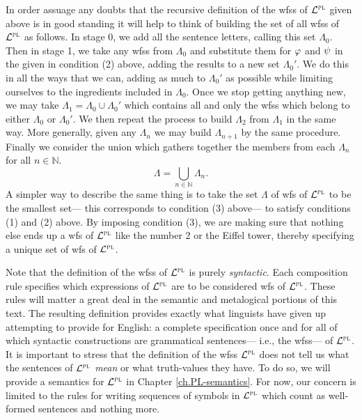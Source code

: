 In order assuage any doubts that the recursive definition of the wfss of $\mathcal{L}^{\textsc{pl}}$ given above is in good standing it will help to think of building the set of all wfss of $\mathcal{L}^{\textsc{pl}}$ as follows.
In stage 0, we add all the sentence letters, calling this set $\Lambda_0$.
Then in stage 1, we take any wfss from $\Lambda_0$ and substitute them for $\varphi$ and $\psi$ in the  given in condition (2) above, adding the results to a new set $\Lambda_0'$.
We do this in all the ways that we can, adding as much to $\Lambda_0'$ as possible while limiting ourselves to the ingredients included in $\Lambda_0$. 
Once we stop getting anything new, we may take $\Lambda_1 = \Lambda_0 \cup \Lambda_0'$ which contains all and only the wfss which belong to either $\Lambda_0$ or $\Lambda_0'$.
We then repeat the process to build $\Lambda_2$ from $\Lambda_1$ in the same way.
More generally, given any $\Lambda_n$ we may build $\Lambda_{n+1}$ by the same procedure.
Finally we consider the union which gathers together the members from each $\Lambda_n$ for all $n \in \mathbb{N}$.
$$\Lambda = \bigcup_{n\in \mathbb{N}}\Lambda_n.$$
A simpler way to describe the same thing is to take the set $\Lambda$ of wfs of $\mathcal{L}^{\textsc{pl}}$ to be the smallest set--- this corresponds to condition (3) above--- to satisfy conditions (1) and (2) above.
By imposing condition (3), we are making sure that nothing else ends up a wfs of $\mathcal{L}^{\textsc{pl}}$ like the number 2 or the Eiffel tower, thereby specifying a unique set of wfs of $\mathcal{L}^{\textsc{pl}}$.

Note that the definition of the wfss of $\mathcal{L}^{\textsc{pl}}$ is purely \emph{syntactic}.
Each composition rule specifies which expressions of $\mathcal{L}^{\textsc{pl}}$ are to be considered wfs of $\mathcal{L}^{\textsc{pl}}$.
These rules will matter a great deal in the semantic and metalogical portions of this text.
The resulting definition provides exactly what linguists have given up attempting to provide for English: a complete specification once and for all of which syntactic constructions are grammatical sentences--- i.e., the wfss--- of $\mathcal{L}^{\textsc{pl}}$.
It is important to stress that the definition of the wfss $\mathcal{L}^{\textsc{pl}}$ does not tell us what the sentences of $\mathcal{L}^{\textsc{pl}}$ \textit{mean} or what truth-values they have.
To do so, we will provide a semantics for $\mathcal{L}^{\textsc{pl}}$ in Chapter \ref{ch.PL-semantics}.
For now, our concern is limited to the rules for writing sequences of symbols in $\mathcal{L}^{\textsc{pl}}$ which count as well-formed sentences and nothing more.


